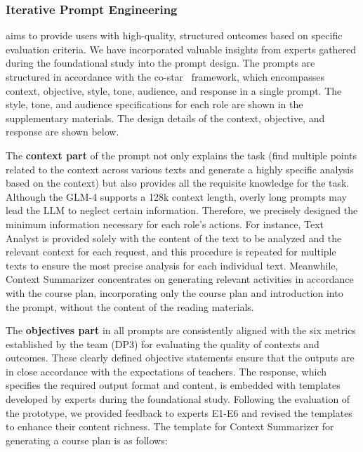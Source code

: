\subsubsection{Iterative Prompt Engineering}
\label{sbsbsc:Iterativeprompt}
\name{} aims to provide users with high-quality, structured outcomes based on specific evaluation criteria. We have incorporated valuable insights from experts gathered during the foundational study into the prompt design. The prompts are structured in accordance with the co-star~\cite{napoli2024leveraging} framework, which encompasses context, objective, style, tone, audience, and response in a single prompt. The style, tone, and audience specifications for each role are shown in the supplementary materials.
The design details of the context, objective, and response are shown below.

The \textbf{context part} of the prompt not only explains the task (\eg find multiple points related to the context across various texts and generate a highly specific analysis based on the context) but also provides all the requisite knowledge for the task. Although the GLM-4 supports a 128k context length, overly long prompts may lead the LLM to neglect certain information. Therefore, we precisely designed the minimum information necessary for each role's actions. For instance, Text Analyst is provided solely with the content of the text to be analyzed and the relevant context for each request, and this procedure is repeated for multiple texts to ensure the most precise analysis for each individual text. Meanwhile, Context Summarizer concentrates on generating relevant activities in accordance with the course plan, incorporating only the course plan and introduction into the prompt, without the content of the reading materials.

The \textbf{objectives part} in all prompts are consistently aligned with the six metrics established by the team (DP3) for evaluating the quality of contexts and outcomes. These clearly defined objective statements ensure that the outputs are in close accordance with the expectations of teachers. The response, which specifies the required output format and content, is embedded with templates developed by experts during the foundational study. Following the evaluation of the prototype, we provided feedback to experts E1-E6 and revised the templates to enhance their content richness. The template for Context Summarizer for generating a course plan is as follows:


